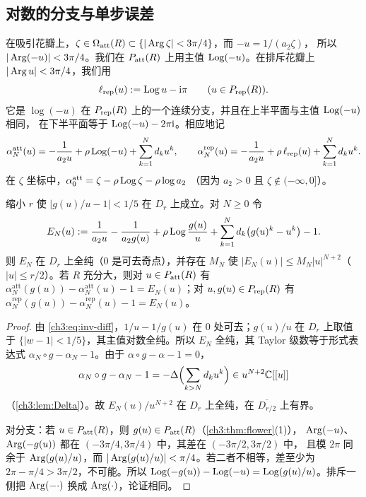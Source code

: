 \subsection{对数的分支与单步误差}
在吸引花瓣上，$\zeta\in\Omega_{\mathrm{att}}(R)\subset\{|\operatorname{Arg}\zeta|<3\pi/4\}$，而 $-u=1/(a_2\zeta)$，
所以 $|\operatorname{Arg}(-u)|<3\pi/4$。我们在 $P_{\mathrm{att}}(R)$ 上用主值 $\operatorname{Log}(-u)$。在排斥花瓣上
$|\operatorname{Arg} u|<3\pi/4$，我们用
\begin{equation}\label{ch3:eq:lrep}
 \ell_{\mathrm{rep}}(u):=\operatorname{Log} u-\mathrm{i}\pi\qquad(u\in P_{\mathrm{rep}}(R)).
\end{equation}
它是 $\log(-u)$ 在 $P_{\mathrm{rep}}(R)$ 上的一个连续分支，并且在上半平面与主值 $\operatorname{Log}(-u)$ 相同，
在下半平面等于 $\operatorname{Log}(-u)-2\pi\mathrm{i}$。相应地记
\[
 \alpha_N^{\mathrm{att}}(u)=-\frac1{a_2u}+\rho\operatorname{Log}(-u)+\sum_{k=1}^Nd_ku^k,\qquad
 \alpha_N^{\mathrm{rep}}(u)=-\frac1{a_2u}+\rho\,\ell_{\mathrm{rep}}(u)+\sum_{k=1}^Nd_ku^k .
\]
在 $\zeta$ 坐标中，$\alpha_0^{\mathrm{att}}=\zeta-\rho\operatorname{Log}\zeta-\rho\log a_2$
（因为 $a_2>0$ 且 $\zeta\notin(-\infty,0]$）。

\begin{lemma}[单步误差]\label{ch3:lem:defect}
缩小 $r$ 使 $|g(u)/u-1|<1/5$ 在 $D_r$ 上成立。对 $N\ge0$ 令
\[
 E_N(u):=\frac{1}{a_2u}-\frac{1}{a_2g(u)}+\rho\operatorname{Log}\frac{g(u)}{u}
 +\sum_{k=1}^Nd_k\bigl(g(u)^k-u^k\bigr)-1 .
\]
则 $E_N$ 在 $D_r$ 上全纯（$0$ 是可去奇点），并存在 $M_N$ 使
$|E_N(u)|\le M_N|u|^{N+2}$（$|u|\le r/2$）。若 $R$ 充分大，则对 $u\in P_{\mathrm{att}}(R)$ 有
$\alpha_N^{\mathrm{att}}(g(u))-\alpha_N^{\mathrm{att}}(u)-1=E_N(u)$；对 $u,g(u)\in P_{\mathrm{rep}}(R)$ 有
$\alpha_N^{\mathrm{rep}}(g(u))-\alpha_N^{\mathrm{rep}}(u)-1=E_N(u)$。
\end{lemma}

\begin{proof}
由 \eqref{ch3:eq:inv-diff}，$1/u-1/g(u)$ 在 $0$ 处可去；$g(u)/u$ 在 $D_r$ 上取值于
$\{|w-1|<1/5\}$，其主值对数全纯。所以 $E_N$ 全纯，其 Taylor 级数等于形式表达式
$\alpha_N\circ g-\alpha_N-1$。由于 $\alpha\circ g-\alpha-1=0$，
\[
 \alpha_N\circ g-\alpha_N-1=-\Delta\Bigl(\sum_{k>N}d_ku^k\Bigr)\in u^{N+2}\mathbb{C}[[u]]
\]
（\cref{ch3:lem:Delta}）。故 $E_N(u)/u^{N+2}$ 在 $D_r$ 上全纯，在 $\overline{D_{r/2}}$ 上有界。

对分支：若 $u\in P_{\mathrm{att}}(R)$，则 $g(u)\in P_{\mathrm{att}}(R)$（\cref{ch3:thm:flower}(1)），
$\operatorname{Arg}(-u)$、$\operatorname{Arg}(-g(u))$ 都在 $(-3\pi/4,3\pi/4)$ 中，其差在 $(-3\pi/2,3\pi/2)$ 中，
且模 $2\pi$ 同余于 $\operatorname{Arg}(g(u)/u)$，而 $|\operatorname{Arg}(g(u)/u)|<\pi/4$。若二者不相等，差至少为
$2\pi-\pi/4>3\pi/2$，不可能。所以 $\operatorname{Log}(-g(u))-\operatorname{Log}(-u)=\operatorname{Log}(g(u)/u)$。排斥一侧把
$\operatorname{Arg}(-\cdot)$ 换成 $\operatorname{Arg}(\cdot)$，论证相同。
\end{proof}

